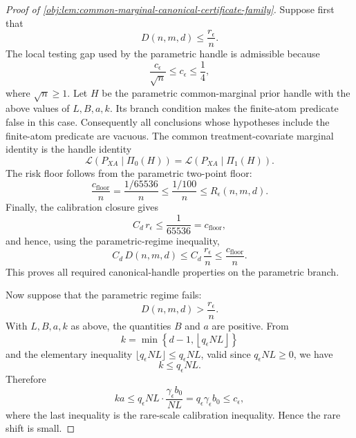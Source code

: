 \begin{proof}[Proof of \cref{obj:lem:common-marginal-canonical-certificate-family}]
Suppose first that
\[
D(n,m,d)\le \frac{r_\epsilon}{n}.
\]
The local testing gap used by the parametric handle is admissible because
\[
\frac{c_\epsilon}{\sqrt n}\le c_\epsilon\le \frac14,
\]
where \(\sqrt n\ge1\).  Let \(H\) be the parametric common-marginal prior handle with the above values of \(L,B,a,k\).  Its branch condition makes the finite-atom predicate false in this case.  Consequently all conclusions whose hypotheses include the finite-atom predicate are vacuous.  The common treatment-covariate marginal identity is the handle identity
\[
\mathcal L(P_{XA}\mid \Pi_0(H))
=
\mathcal L(P_{XA}\mid \Pi_1(H)).
\]
The risk floor follows from the parametric two-point floor:
\[
\frac{c_{\mathrm{floor}}}{n}
=
\frac{1/65536}{n}
\le
\frac{1/100}{n}
\le
R_\epsilon(n,m,d).
\]
Finally, the calibration closure gives
\[
C_d\,r_\epsilon\le \frac1{65536}=c_{\mathrm{floor}},
\]
and hence, using the parametric-regime inequality,
\[
C_d\,D(n,m,d)
\le
C_d\,\frac{r_\epsilon}{n}
\le
\frac{c_{\mathrm{floor}}}{n}.
\]
This proves all required canonical-handle properties on the parametric branch. %

Now suppose that the parametric regime fails:
\[
D(n,m,d)>\frac{r_\epsilon}{n}.
\]
With \(L,B,a,k\) as above, the quantities \(B\) and \(a\) are positive.  From
\[
k=\min\left\{d-1,\left\lfloor q_\epsilon NL\right\rfloor\right\}
\]
and the elementary inequality \(\lfloor q_\epsilon NL\rfloor\le q_\epsilon NL\), valid since \(q_\epsilon NL\ge0\), we have
\[
k\le q_\epsilon NL.
\]
Therefore
\[
ka
\le
q_\epsilon NL\cdot
\frac{\gamma_\epsilon b_0}{NL}
=
q_\epsilon\gamma_\epsilon b_0
\le c_\epsilon,
\]
where the last inequality is the rare-scale calibration inequality.  Hence the rare shift is small. %


\end{proof}
